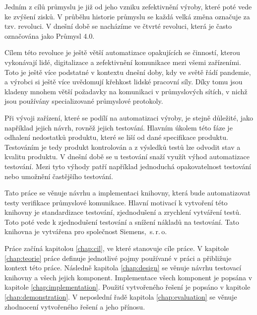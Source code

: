\begin{introduction}

Jedním z cílů průmyslu je již od jeho vzniku zefektivnění výroby, které poté vede ke zvýšení zisků. V průběhu historie průmyslu se každá velká změna označuje za tzv. revoluci. V dnešní době se nacházíme ve čtvrté revoluci, která je často označována jako Průmysl 4.0. 
    
Cílem této revoluce je ještě větší automatizace opakujících se činností, kterou vykonávají lidé, digitalizace a zefektivnění komunikace mezi všemi zařízeními. Toto je ještě více podstatné v kontextu dnešní doby, kdy ve světě řádí pandemie, a výrobci si ještě více uvědomují křehkost lidské pracovní síly. Díky tomu jsou kladeny mnohem větší požadavky na komunikaci v průmyslových sítích, v nichž jsou používány specializované průmyslové protokoly. 
    
Při vývoji zařízení, které se podílí na automatizaci výroby, je stejně důležité, jako například jejich návrh, rovněž jejich testování. Hlavním úkolem této fáze je odhalení nedostatků produktu, které se liší od dané specifikace produktu. Testováním je tedy produkt kontrolován a z výsledků testů lze odvodit stav a kvalitu produktu. V dnešní době se u testování snaží využít výhod automatizace testování. Mezi tyto výhody patří například jednoduchá opakovatelnost testování nebo umožnění častějšího testování. 
    
Tato práce se věnuje návrhu a implementaci knihovny, která bude automatizovat testy verifikace průmyslové komunikace. Hlavní motivací k vytvoření této knihovny je standardizace testování, zjednodušení a zrychlení vytváření testů. Toto poté vede k zjednodušení testování a snížení nákladů na testování. Tato knihovna je vytvářena pro společnost Siemens,~s.\,{}r.\,{}o.
    
Práce začíná kapitolou \ref{chap:cil}, ve které stanovuje cíle práce. V kapitole \ref{chap:teorie} práce definuje jednotlivé pojmy používané v práci a přibližuje kontext této práce. Následně kapitola \ref{chap:design} se věnuje návrhu testovací knihovny a všech jejich komponent. Implementace všech komponent je popsána v kapitole \ref{chap:implementation}. Použití vytvořeného řešení je popsáno v kapitole \ref{chap:demonstration}. V neposlední řadě kapitola \ref{chap:evaluation} se věnuje zhodnocení vytvořeného řešení a jeho přínosu.
\end{introduction}